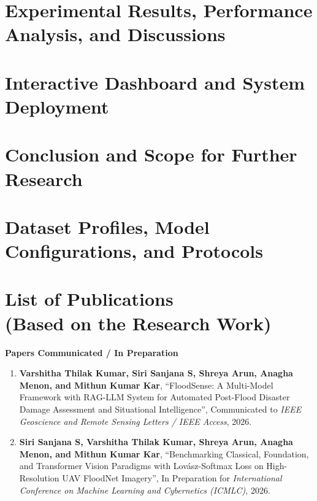 \documentclass[a4paper, 12pt]{report}
\theoremstyle{definition}
\begin{document}
	\chapter{Experimental Results, Performance Analysis, and Discussions}
	

	\chapter{Interactive Dashboard and System Deployment}
	

	\chapter{Conclusion and Scope for Further Research}
	

	\appendix
	\chapter{Dataset Profiles, Model Configurations, and Protocols}
	

	\newpage
	\renewcommand{\bibname}{References}
	
	

	\chapter*{List of Publications \\ \large(Based on the Research Work)}
	
	\textbf{\Large Papers Communicated / In Preparation}
	\begin{enumerate}
		\item \textbf{Varshitha Thilak Kumar, Siri Sanjana S, Shreya Arun, Anagha Menon, and Mithun Kumar Kar}, \enquote{FloodSense: A Multi-Model Framework with RAG-LLM System for Automated Post-Flood Disaster Damage Assessment and Situational Intelligence}, Communicated to \textit{IEEE Geoscience and Remote Sensing Letters / IEEE Access}, 2026.
		\item \textbf{Siri Sanjana S, Varshitha Thilak Kumar, Shreya Arun, Anagha Menon, and Mithun Kumar Kar}, \enquote{Benchmarking Classical, Foundation, and Transformer Vision Paradigms with Lov\'{a}sz-Softmax Loss on High-Resolution UAV FloodNet Imagery}, In Preparation for \textit{International Conference on Machine Learning and Cybernetics (ICMLC)}, 2026.
	\end{enumerate}
\end{document}
